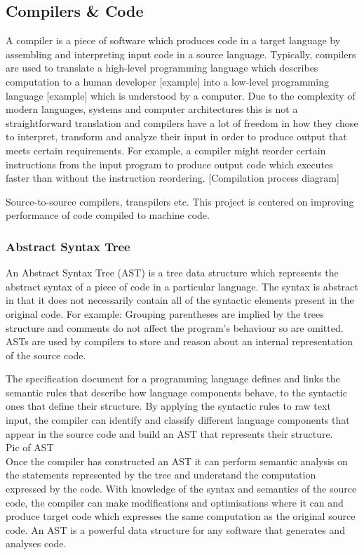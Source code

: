 \documentclass[a4paper,12pt,twoside]{report}
\begin{document}
\subsection{Compilers \& Code}
A compiler is a piece of software which produces code in a target language by assembling and interpreting input code in a source language.
Typically, compilers are used to translate a high-level programming language which describes computation to a human developer [example] into 
a low-level programming language [example] which is understood by a computer. Due to the complexity of modern languages, systems and computer
architectures this is not a straightforward translation and compilers have a lot of freedom in how they chose to interpret, transform and analyze
their input in order to produce output that meets certain requirements. For example, a compiler might reorder certain instructions from the input
program to produce output code which executes faster than without the instruction reordering.
[Compilation process diagram]

Source-to-source compilers, transpilers etc. This project is centered on improving performance of code compiled to machine code.

\subsubsection{Abstract Syntax Tree}
An Abstract Syntax Tree (AST) is a tree data structure which represents the abstract syntax of a piece of
code in a particular language. The syntax is abstract in that it does not necessarily contain all of the
syntactic elements present in the original code. For example: Grouping parentheses are implied by the
trees structure and comments do not affect the program's behaviour so are omitted. ASTs are used 
by compilers to store and reason about an internal representation of the source code.

The specification document for a programming language defines and links the semantic rules that describe 
how language components behave, to the syntactic ones that define their structure. 
By applying the syntactic rules to raw text input, the compiler can identify and classify different 
language components that appear in the source code and build an AST that represents their structure.
\\
Pic of AST
\\
Once the compiler has constructed an AST it can perform semantic analysis on the statements represented
by the tree and understand the computation expressed by the code. With knowledge of the syntax and 
semantics of the source code, the compiler can make modifications and optimisations where it can and produce 
target code which expresses the same computation as the original source code. An AST is a powerful
data structure for any software that generates and analyses code.
\end{document}
